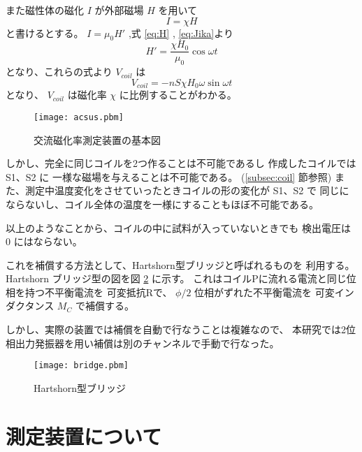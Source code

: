 また磁性体の磁化 $I$ が外部磁場 $H$ を用いて
\begin{equation}
I=\chi H
\label{eq:Jika}
\end{equation}
と書けるとする。 $I=\mu_0 H'$ ,式 \ref{eq:H} , \ref{eq:Jika}より
\begin{equation}
H'=\frac{\chi H_0}{\mu_0} \cos \omega t
\label{eq:H'}
\end{equation}
となり、これらの式より $V_{coil}$ は
\begin{equation}
V_{coil}=-n S \chi H_0 \omega \sin \omega t
\label{eq:Vcoil2}
\end{equation}
となり、 $V_{coil}$ は磁化率 $\chi$ に比例することがわかる。



\begin{figure}[tbh]
  \begin{center}
	\texttt{[image: acsus.pbm]}
  \end{center}
  \caption{交流磁化率測定装置の基本図}
  \label{fig:acsus}
\end{figure}

しかし、完全に同じコイルを2つ作ることは不可能であるし
作成したコイルでは S1、S2 に
一様な磁場を与えることは不可能である。 (\ref{subsec:coil} 節参照)
また、測定中温度変化をさせていったときコイルの形の変化が S1、S2 で
同じにならないし、コイル全体の温度を一様にすることもほぼ不可能である。

以上のようなことから、コイルの中に試料が入っていないときでも
検出電圧は $0$ にはならない。

これを補償する方法として、Hartshorn型ブリッジと呼ばれるものを
利用する。
Hartshorn ブリッジ型の図を図 \ref{fig:Hartshorn ブリッジ} に示す。
これはコイルPに流れる電流と同じ位相を持つ不平衡電流を
可変抵抗Rで、 $\phi / 2$ 位相がずれた不平衡電流を
可変インダクタンス $M_C$ で補償する。

しかし、実際の装置では補償を自動で行なうことは複雑なので、
本研究では2位相出力発振器を用い補償は別のチャンネルで手動で行なった。

\begin{figure}[hbtp]
\begin{center}
\texttt{[image: bridge.pbm]}
\end{center}
\caption{Hartshorn型ブリッジ}
\label{fig:Hartshorn ブリッジ}
\end{figure}


\section{測定装置について}\label{sec:souti}

